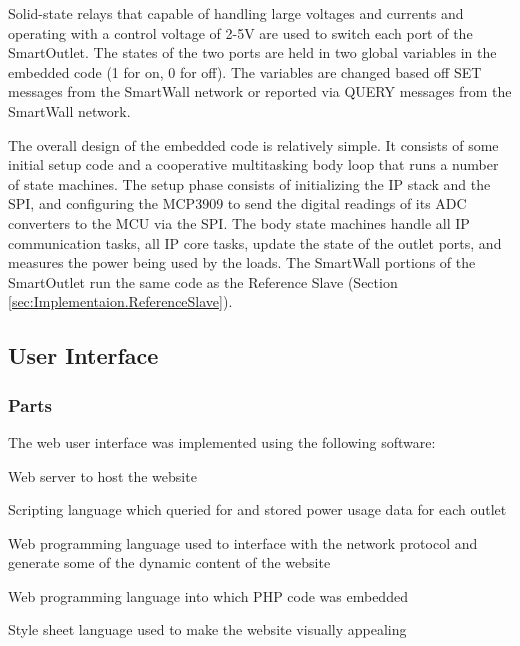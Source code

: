 \documentclass[12pt]{article}
\begin{document}
Solid-state relays that capable of handling large
voltages and currents and operating with a control
voltage of 2-5V are used to switch each port of the SmartOutlet.
The states of the two ports are held in two
global variables in the embedded code (1 for on, 0 for off).  The
variables are changed based off SET messages from the SmartWall
network or reported via QUERY messages from the SmartWall network.

The overall design of the embedded code is relatively simple.
It consists of some initial setup code and a cooperative multitasking
body  loop that runs a number of state machines.
The setup phase consists of
initializing the IP stack and the SPI, and configuring the MCP3909 to
send the digital readings of its ADC converters to the MCU via the
SPI. The body state machines handle all IP communication tasks, all IP
core tasks, update the state of the outlet ports, and measures the
power being used by the loads. The SmartWall portions of the
SmartOutlet run the same code as the Reference Slave (Section
\ref{sec:Implementaion.ReferenceSlave}).

\subsection{User Interface}
\subsubsection{Parts}
The web user interface was implemented using the following software:
\begin{description}
  \setlength{\itemsep}{0pt}
  \setlength{\parskip}{0pt}
  \setlength{\parsep}{0pt}
\item[Apache2:] Web server to host the website
\item[Perl:] Scripting language which queried for and stored power usage
  data for each outlet
\item[PHP5:] Web programming language used to interface with the network
  protocol and generate some of the dynamic content of the website
\item[HTML:] Web programming language into which PHP code was embedded
\item[CSS:] Style sheet language used to make the website visually appealing
\end{description}
\end{document}
